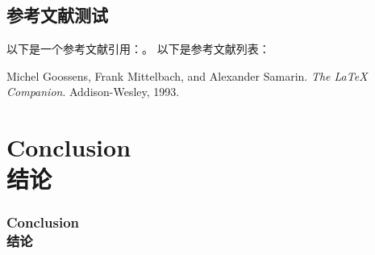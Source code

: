 \documentclass[aspectratio=169]{ctexbeamer}
\begin{document}
\subsection{参考文献测试}
\begin{frame}
以下是一个参考文献引用：\cite{latexcompanion}。
\framebreak%
以下是参考文献列表：
\begin{thebibliography}{9}
Michel Goossens, Frank Mittelbach, and Alexander Samarin.
\textit{The LaTeX Companion}.
Addison-Wesley, 1993.
\end{thebibliography}
\end{frame}

\section{Conclusion\\结论}
\begin{frame}
\frametitle{Conclusion\\结论}
\lipsum[3]
\end{frame}

\begin{frame}
\zhlipsum[3]
\end{frame}
\end{document}
